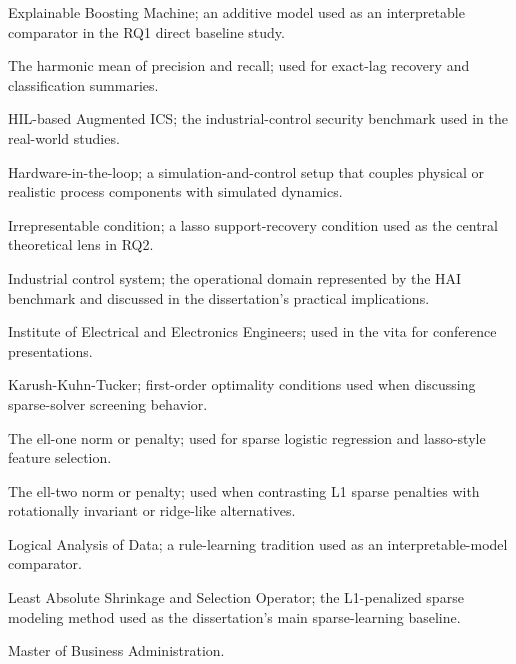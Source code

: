 \begin{description}[style=nextline,leftmargin=0pt,labelsep=0pt]
    \item[EBM] Explainable Boosting Machine; an additive model used as an interpretable comparator in the RQ1 direct baseline study.

    \item[F1] The harmonic mean of precision and recall; used for exact-lag recovery and classification summaries.

    \item[HAI] HIL-based Augmented ICS; the industrial-control security benchmark used in the real-world studies.

    \item[HIL] Hardware-in-the-loop; a simulation-and-control setup that couples physical or realistic process components with simulated dynamics.

    \item[IC] Irrepresentable condition; a lasso support-recovery condition used as the central theoretical lens in RQ2.

    \item[ICS] Industrial control system; the operational domain represented by the HAI benchmark and discussed in the dissertation's practical implications.

    \item[IEEE] Institute of Electrical and Electronics Engineers; used in the vita for conference presentations.

    \item[KKT] Karush-Kuhn-Tucker; first-order optimality conditions used when discussing sparse-solver screening behavior.

    \item[L1] The ell-one norm or penalty; used for sparse logistic regression and lasso-style feature selection.

    \item[L2] The ell-two norm or penalty; used when contrasting L1 sparse penalties with rotationally invariant or ridge-like alternatives.

    \item[LAD] Logical Analysis of Data; a rule-learning tradition used as an interpretable-model comparator.

    \item[LASSO] Least Absolute Shrinkage and Selection Operator; the L1-penalized sparse modeling method used as the dissertation's main sparse-learning baseline.

    \item[M.B.A.] Master of Business Administration.


\end{description}
